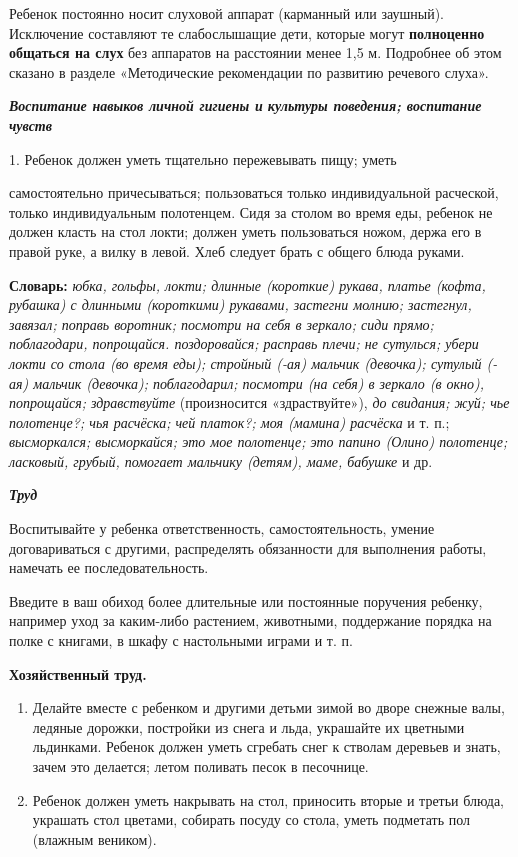 \documentclass{book}
\renewcommand{\emph}[1]{\textit{#1}}
\begin{document}
Ребенок постоянно носит слуховой аппарат (карманный или заушный).
Исключение составляют те слабослышащие дети, которые могут
\textbf{полноценно общаться на слух} без аппаратов на расстоянии менее
1,5 м. Подробнее об этом сказано в разделе «Методические рекомендации по
развитию речевого слуха».

\emph{\textbf{Воспитание навыков личной гигиены и} \textbf{культуры
поведения; воспитание чувств}}

1. Ребенок должен уметь тщательно пережевывать пищу; уметь

самостоятельно причесываться; пользоваться только индивидуальной
расческой, только индивидуальным полотенцем. Сидя за столом во время
еды, ребенок не должен класть на стол локти; должен уметь пользоваться
ножом, держа его в правой руке, а вилку в левой. Хлеб следует брать с
общего блюда руками.

\textbf{Словарь:} \emph{юбка, гольфы, локти; длинные (короткие) рукава,
платье (кофта, рубашка) с длинными (короткими) рукавами, застегни
молнию; застегнул, завязал; поправь воротник; посмотри на себя в
зеркало; сиди прямо; поблагодари, попрощайся. поздоровайся; расправь
плечи; не сутулься; убери локти со стола (во время еды); стройный (-ая)
мальчик (девочка); сутулый (-ая) мальчик (девочка); поблагодарил;
посмотри (на себя) в зеркало (в окно), попрощайся; здравствуйте}
(произносится «здраствуйте»), \emph{до свидания; жуй; чье полотенце?;
чья расчёска; чей платок?; моя (мамина) расчёска} и т. п.;
\emph{высморкался; высморкайся; это мое полотенце; это папино (Олино)
полотенце; ласковый, грубый, помогает мальчику (детям), маме, бабушке} и
др.

\emph{\textbf{Труд}}

Воспитывайте у ребенка ответственность, самостоятельность, умение
договариваться с другими, распределять обязанности для выполнения
работы, намечать ее последовательность.

Введите в ваш обиход более длительные или постоянные поручения ребенку,
например уход за каким-либо растением, животными, поддержание порядка на
полке с книгами, в шкафу с настольными играми и т. п.

\textbf{Хозяйственный труд.}


\begin{enumerate}
\def\labelenumi{\arabic{enumi}.}
\item
  
  Делайте вместе с ребенком и другими детьми зимой во дворе снежные
  валы, ледяные дорожки, постройки из снега и льда, украшайте их
  цветными льдинками. Ребенок должен уметь сгребать снег к стволам
  деревьев и знать, зачем это делается; летом поливать песок в
  песочнице.
  
\item
  
  Ребенок должен уметь накрывать на стол, приносить вторые и третьи
  блюда, украшать стол цветами, собирать посуду со стола, уметь
  подметать пол (влажным веником).
  
\end{enumerate}
\end{document}
